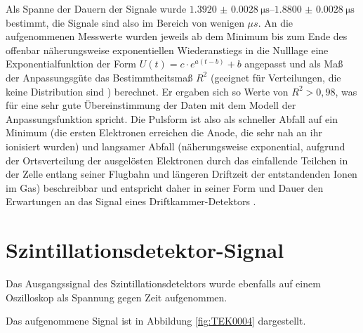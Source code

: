 Als Spanne der Dauern der Signale wurde $\SIrange{1.3920(28)}{1.8800(28)}{\micro\s}$ bestimmt, die Signale sind also im Bereich von wenigen $\unit{\mu s}$.
An die aufgenommenen Messwerte wurden jeweils ab dem Minimum bis zum Ende des offenbar näherungsweise exponentiellen Wiederanstiegs in die Nulllage eine Exponentialfunktion der Form $U(t)=c\cdot e^{a(t-b)}+b$ angepasst und als Maß der Anpassungsgüte das Bestimmtheitsmaß $R^2$ (geeignet für Verteilungen, die keine Distribution sind \cite{rsquared}) berechnet. Er ergaben sich so Werte von $R^2 > 0,98$, was für eine sehr gute Übereinstimmung der Daten mit dem Modell der Anpassungsfunktion spricht. Die Pulsform ist also als schneller Abfall auf ein Minimum (die ersten Elektronen erreichen die Anode, die sehr nah an ihr ionisiert wurden) und langsamer Abfall (näherungsweise exponential, aufgrund der Ortsverteilung der ausgelösten Elektronen durch das einfallende Teilchen in der Zelle entlang seiner Flugbahn und längeren Driftzeit der entstandenden Ionen im Gas) beschreibbar und entspricht daher in seiner Form und Dauer den Erwartungen an das Signal eines Driftkammer-Detektors \cite[144-145]{leotechniques}.



\section{Szintillationsdetektor-Signal}
Das Ausgangssignal des Szintillationsdetektors wurde ebenfalls auf einem Oszilloskop als Spannung gegen Zeit aufgenommen.

Das aufgenommene Signal ist in Abbildung \ref{fig:TEK0004} dargestellt.


